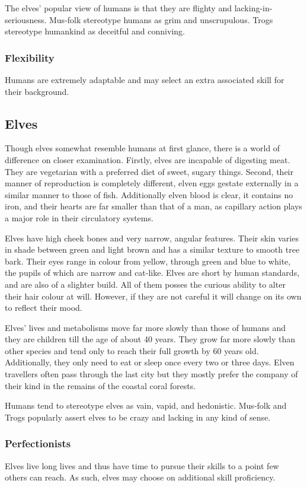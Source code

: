 \documentclass[a4paper,11pt,oneside]{book}
\begin{document}
The elves' popular view of humans is that they are flighty and lacking-in-seriousness. Mus-folk stereotype humans as grim and unscrupulous. Trogs stereotype humankind as deceitful and conniving.  

\subsubsection*{Flexibility}
Humans are extremely adaptable and may select an extra associated skill for their background.

\subsection{Elves}
Though elves somewhat resemble humans at first glance, there is a world of difference on closer examination. Firstly, elves are incapable of digesting meat. They are vegetarian with a preferred diet of sweet, sugary things. Second, their manner of reproduction is completely different, elven eggs gestate externally in a similar manner to those of fish. Additionally elven blood is clear, it contains no iron, and their hearts are far smaller than that of a man, as capillary action plays a major role in their circulatory systems.

Elves have high cheek bones and very narrow, angular features. Their skin varies in shade between green and light brown and has a similar texture to smooth tree bark. Their eyes range in colour from yellow, through green and blue to white, the pupils of which are narrow and cat-like. Elves are short by human standards, and are also of a slighter build. All of them posses the curious ability to alter their hair colour at will. However, if they are not careful it will change on its own to reflect their mood. 

Elves' lives and metabolisms move far more slowly than those of humans and they are children till the age of about 40 years. They grow far more slowly than other species and tend only to reach their full growth by 60 years old. Additionally, they only need to eat or sleep once every two or three days. Elven travellers often pass through the last city but they mostly prefer the company of their kind in the remains of the coastal coral forests.

Humans tend to stereotype elves as vain, vapid, and hedonistic. Mus-folk and Trogs popularly assert elves to be crazy and lacking in any kind of sense. 

\subsubsection*{Perfectionists}
Elves live long lives and thus have time to pursue their skills to a point few others can reach. As such, elves may choose on additional skill proficiency.
\end{document}
